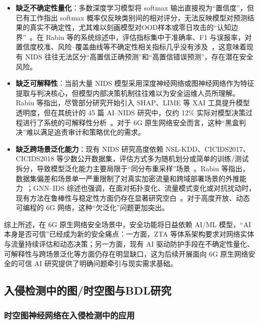 \begin{itemize}
  \item \textbf{缺乏不确定性量化}：多数深度学习模型将 softmax 输出直接视为“置信度”，但已有工作指出 softmax 概率仅反映类别间的相对评分，无法反映模型对预测结果的真实不确定性，尤其难以刻画模型对OOD样本或零日攻击的“认知边界”~\cite{Guo_Calibration_2017,Gal_Uncertainty_2016}。在 Rabiu 等的系统综述中，评估指标集中于准确率、F1 与误报率，对置信度校准、风险–覆盖曲线等不确定性相关指标几乎没有涉及~\cite{Rabiu_AIDriven_NIDS_Review_2025}，这意味着现有 NIDS 往往无法区分“高置信正确预测”和“高置信错误预测”，存在潜在安全风险。

  \item \textbf{缺乏可解释性}：当前大量 NIDS 模型采用深度神经网络或图神经网络作为特征提取与判决核心，但模型内部决策机制往往难以为安全运维人员所理解。Rabiu 等指出，尽管部分研究开始引入 SHAP、LIME 等 XAI 工具提升模型透明度，但在其统计的 45 篇 AI–NIDS 研究中，仅约 12\% 实际对模型决策过程进行了系统的可解释性分析~\cite{Rabiu_AIDriven_NIDS_Review_2025}。对于 6G 原生网络安全而言，这种“黑盒判决”难以满足追责审计和策略优化的需求。

  \item \textbf{缺乏跨场景泛化能力}：现有 NIDS 研究高度依赖 NSL-KDD、CICIDS2017、CICIDS2018 等少数公开数据集，评估方式多为随机划分或简单的训练/测试拆分，导致模型泛化能力主要局限于“同分布重采样”场景~\cite{DataDriven_NIDS_Survey_2021}。Rabiu 等指出，数据集偏差和场景单一严重限制了对真实加密流量和跨域部署场景的外推能力~\cite{Rabiu_AIDriven_NIDS_Review_2025}；GNN–IDS 综述也强调，在面对拓扑变化、流量模式变化或对抗扰动时，现有方法在鲁棒性与稳定性方面仍存在显著研究空白~\cite{Zhong_GNN_IDS_Survey_2024}。对于高度开放、动态可编程的 6G 网络，这种“欠泛化”问题更加突出。
\end{itemize}

综上所述，在 6G 原生网络安全场景中，安全功能将日益依赖 AI/ML 模型，“AI 本身是否可信”已经成为新的安全痛点：一方面，ZTA 等体系架构要求对网络实体与流量持续评估和动态决策；另一方面，现有 AI 驱动防护手段在不确定性量化、可解释性与跨场景泛化等方面仍存在明显缺口，这为后续开展面向 6G 原生网络安全的可信 AI 研究提供了明确问题牵引与现实需求基础。


\subsection{入侵检测中的图/时空图与BDL研究}

\subsubsection{时空图神经网络在入侵检测中的应用}

